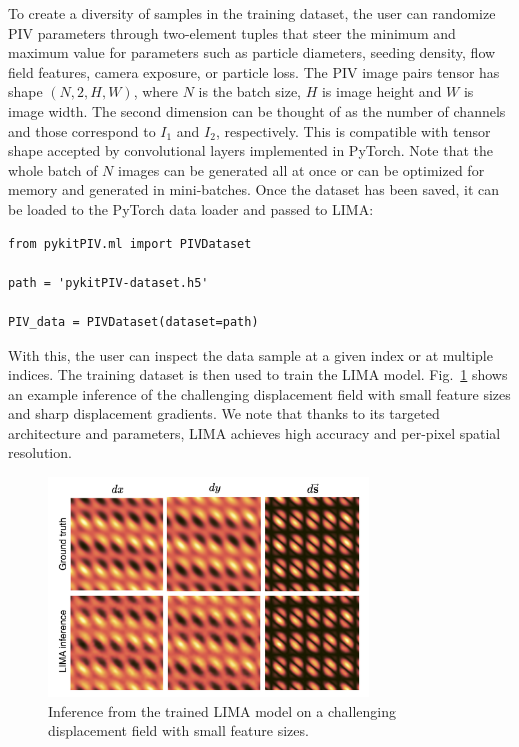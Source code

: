 \documentclass[a4paper,fleqn]{cas-dc}
\newcommand{ \kamila}[1]{\color{blue}{Kamila: #1} \color{black}}
\begin{document}
To create a diversity of samples in the training dataset, the user can randomize PIV parameters through two-element tuples that steer the minimum and maximum value for parameters such as particle diameters, seeding density, flow field features, camera exposure, or particle loss. The PIV image pairs tensor has shape $(N, 2, H, W)$, where $N$ is the batch size, $H$ is image height and $W$ is image width. The second dimension can be thought of as the number of channels and those correspond to $I_1$ and $I_2$, respectively. This is compatible with tensor shape accepted by convolutional layers implemented in PyTorch. Note that the whole batch of $N$ images can be generated all at once or can be optimized for memory and generated in mini-batches. Once the dataset has been saved, it can be loaded to the PyTorch data loader and passed to LIMA:
\lstset{language=Python}
\begin{lstlisting}
from pykitPIV.ml import PIVDataset

path = 'pykitPIV-dataset.h5'

PIV_data = PIVDataset(dataset=path)
\end{lstlisting}
With this, the user can inspect the data sample at a given index or at multiple indices. The training dataset is then used to train the LIMA model. Fig.~\ref{fig:LIMA} shows an example inference of the challenging displacement field with small feature sizes and sharp displacement gradients. We note that thanks to its targeted architecture and parameters, LIMA achieves high accuracy and per-pixel spatial resolution.

\begin{figure}[t]
\centering
\includegraphics[width=8.5cm]{LIMA-inference.pdf}
\caption{Inference from the trained LIMA model on a challenging displacement field with small feature sizes. \kamila{This is my old training case, I will update it with the latest LIMA version after running new training on CSCS...}}
\label{fig:LIMA}
\end{figure}
\end{document}
